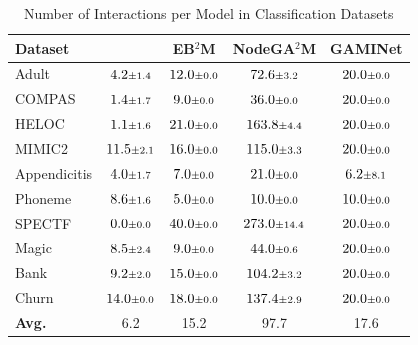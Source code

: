 \begin{table}[t]
  \centering
  \caption{Number of Interactions per Model in Classification Datasets}
  \label{tab:classification_interactions}
    \begin{tabular}{lcccc}
      \toprule
      \textbf{Dataset} & \textbf{\method{}} & \textbf{EB$^2$M} & \textbf{NodeGA$^2$M} & \textbf{GAMINet} \\
      \midrule
        Adult & $4.2 \text{\scriptsize$\pm$1.4}$ & $12.0 \text{\scriptsize$\pm$0.0}$ & $72.6 \text{\scriptsize$\pm$3.2}$ & $20.0 \text{\scriptsize$\pm$0.0}$ \\
        COMPAS & $1.4 \text{\scriptsize$\pm$1.7}$ & $9.0 \text{\scriptsize$\pm$0.0}$ & $36.0 \text{\scriptsize$\pm$0.0}$ & $20.0 \text{\scriptsize$\pm$0.0}$ \\
        HELOC & $1.1 \text{\scriptsize$\pm$1.6}$ & $21.0 \text{\scriptsize$\pm$0.0}$ & $163.8 \text{\scriptsize$\pm$4.4}$ & $20.0 \text{\scriptsize$\pm$0.0}$ \\
        MIMIC2 & $11.5 \text{\scriptsize$\pm$2.1}$ & $16.0 \text{\scriptsize$\pm$0.0}$ & $115.0 \text{\scriptsize$\pm$3.3}$ & $20.0 \text{\scriptsize$\pm$0.0}$ \\
        Appendicitis & $4.0 \text{\scriptsize$\pm$1.7}$ & $7.0 \text{\scriptsize$\pm$0.0}$ & $21.0 \text{\scriptsize$\pm$0.0}$ & $6.2 \text{\scriptsize$\pm$8.1}$ \\
        Phoneme & $8.6 \text{\scriptsize$\pm$1.6}$ & $5.0 \text{\scriptsize$\pm$0.0}$ & $10.0 \text{\scriptsize$\pm$0.0}$ & $10.0 \text{\scriptsize$\pm$0.0}$ \\
        SPECTF & $0.0 \text{\scriptsize$\pm$0.0}$ & $40.0 \text{\scriptsize$\pm$0.0}$ & $273.0 \text{\scriptsize$\pm$14.4}$ & $20.0 \text{\scriptsize$\pm$0.0}$ \\
        Magic & $8.5 \text{\scriptsize$\pm$2.4}$ & $9.0 \text{\scriptsize$\pm$0.0}$ & $44.0 \text{\scriptsize$\pm$0.6}$ & $20.0 \text{\scriptsize$\pm$0.0}$ \\
        Bank & $9.2 \text{\scriptsize$\pm$2.0}$ & $15.0 \text{\scriptsize$\pm$0.0}$ & $104.2 \text{\scriptsize$\pm$3.2}$ & $20.0 \text{\scriptsize$\pm$0.0}$ \\
        Churn & $14.0 \text{\scriptsize$\pm$0.0}$ & $18.0 \text{\scriptsize$\pm$0.0}$ & $137.4 \text{\scriptsize$\pm$2.9}$ & $20.0 \text{\scriptsize$\pm$0.0}$ \\
      \midrule
      \textbf{Avg.} & 6.2 & 15.2 & 97.7 & 17.6 \\
      \bottomrule
    \end{tabular}
\end{table}

